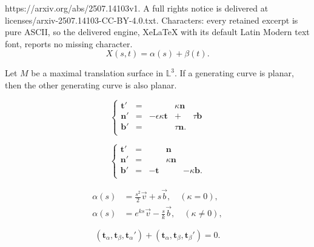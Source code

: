 \documentclass[10pt,a4paper]{amsart}
\def\b{\mathbf b}
\def\n{\mathbf n}
\def\rr{\mathbb L}
\def\t{\mathbf t}
\begin{document}
https://arxiv.org/abs/2507.14103v1. A full rights notice is delivered at licenses/arxiv-2507.14103-CC-BY-4.0.txt. Characters: every retained excerpt is pure ASCII, so the delivered engine, XeLaTeX with its default Latin Modern text font, reports no missing character.
\begin{equation}\label{tt}
X(s,t)=\alpha(s)+\beta(t).
\end{equation}

\begin{theorem} \label{t1}
Let $M$ be a maximal translation  surface in $\rr^3$. If a generating curve is planar, then the other generating curve is also planar.  
\end{theorem}

\begin{equation}\label{f1}
\left\{\begin{array}{ccccc}
\t'&=& &\kappa \n & \\
\n'&=&-\epsilon\kappa \t& +& \tau \b\\
\b'&=& & \tau \n. & \\
\end{array}\right.
\end{equation}

\begin{equation}\label{f3}
\left\{\begin{array}{ccccc}
\t'&=& & \n & \\
\n'&=&& \kappa \n&  \\
\b'&=&-\t &  &-\kappa \b. \\
\end{array}\right.
\end{equation}

\begin{equation}\label{pr11}
\begin{split}
\alpha(s)&=\frac{s^2}{2}\vec{v}+s\vec{b},\quad (\kappa=0),\\
\alpha(s)&=e^{ks}\vec{v}-\frac{s}{k}\vec{b},\quad (\kappa\not=0),
\end{split}
\end{equation}

\begin{equation}\label{eq1}
 (\t_\alpha,\t_\beta,\t_\alpha')+(\t_\alpha,\t_\beta,\t_\beta')=0.
\end{equation}
\end{document}
